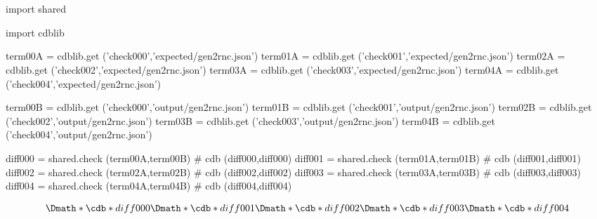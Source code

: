 \documentclass[12pt]{cdblatex}
\begin{document}
\section*{\jobname}


\begin{cadabra}
   import shared

   import cdblib

   term00A = cdblib.get ('check000','expected/gen2rnc.json')
   term01A = cdblib.get ('check001','expected/gen2rnc.json')
   term02A = cdblib.get ('check002','expected/gen2rnc.json')
   term03A = cdblib.get ('check003','expected/gen2rnc.json')
   term04A = cdblib.get ('check004','expected/gen2rnc.json')

   term00B = cdblib.get ('check000','output/gen2rnc.json')
   term01B = cdblib.get ('check001','output/gen2rnc.json')
   term02B = cdblib.get ('check002','output/gen2rnc.json')
   term03B = cdblib.get ('check003','output/gen2rnc.json')
   term04B = cdblib.get ('check004','output/gen2rnc.json')

   diff000 = shared.check (term00A,term00B)   # cdb (diff000,diff000)
   diff001 = shared.check (term01A,term01B)   # cdb (diff001,diff001)
   diff002 = shared.check (term02A,term02B)   # cdb (diff002,diff002)
   diff003 = shared.check (term03A,term03B)   # cdb (diff003,diff003)
   diff004 = shared.check (term04A,term04B)   # cdb (diff004,diff004)

\end{cadabra}

\begin{dgroup*}
   \Dmath*{ \cdb*{diff000} }
   \Dmath*{ \cdb*{diff001} }
   \Dmath*{ \cdb*{diff002} }
   \Dmath*{ \cdb*{diff003} }
   \Dmath*{ \cdb*{diff004} }
\end{dgroup*}
\end{document}
